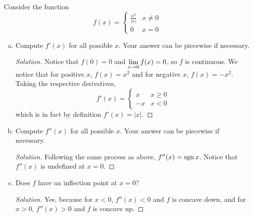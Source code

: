 \question Consider the function
\[ f(x) = \begin{cases}
    \frac{x^3}{|x|} & x \neq 0 \\
    0               & x = 0
  \end{cases} \]
\begin{enumerate}[(a)]
  \item Compute $f'(x)$ for all possible $x$. Your answer can be piecewise if necessary.
        \begin{proof}[Solution]
          Notice that $f(0)=0$ and $\displaystyle\lim_{x\to0}f(x)=0$, so $f$ is continuous.
          We notice that for positive $x$, $f(x)=x^2$ and for negative $x$, $f(x)=-x^2$.
          Taking the respective derivatives,
          \[ f'(x)=\begin{cases} x & x\geq0 \\ -x & x<0 \end{cases} \]
          which is in fact by definition $f'(x)=|x|$.
        \end{proof}
  \item Compute $f''(x)$ for all possible $x$. Your answer can be piecewise if necessary.
        \begin{proof}[Solution]
          Following the same process as above, $f''(x)=\operatorname{sgn} x$.
          Notice that $f''(x)$ is undefined at $x=0$.
        \end{proof}
  \item Does $f$ have an inflection point at $x=0$?
        \begin{proof}[Solution]
          Yes, because for $x < 0$, $f''(x) < 0$ and $f$ is concave down,
          and for $x > 0$, $f''(x) > 0$ and $f$ is concave up.
        \end{proof}
\end{enumerate}



